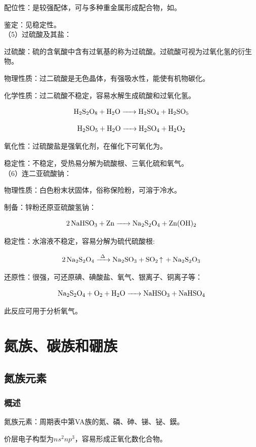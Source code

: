 \documentclass[a4paper,UTF8]{article}
\begin{document}
配位性：是较强配体，可与多种重金属形成配合物，如。

鉴定：见稳定性。\\

（5）过硫酸及其盐：

过硫酸：硫的含氧酸中含有过氧基的称为过硫酸。过硫酸可视为过氧化氢的衍生物。

物理性质：过二硫酸是无色晶体，有强吸水性，能使有机物碳化。

化学性质：过二硫酸不稳定，容易水解生成硫酸和过氧化氢。

$$ \ce{H2S2O8 + H2O -> H2SO4 + H2SO5} $$

$$ \ce{H2SO5 + H2O -> H2SO4 + H2O2} $$

氧化性：过硫酸盐是强氧化剂，在催化下可氧化为。

稳定性：不稳定，受热易分解为硫酸根、三氧化硫和氧气。\\

（6）连二亚硫酸钠：

物理性质：白色粉末状固体，俗称保险粉，可溶于冷水。

制备：锌粉还原亚硫酸氢钠：

$$ \ce{2NaHSO3 + Zn -> Na2S2O4 + Zn(OH)2} $$

稳定性：水溶液不稳定，容易分解为硫代硫酸根:

$$ \ce{2Na2S2O4 ->[\Delta] Na2SO3 + SO2 ^ + Na2S2O3} $$

还原性：很强，可还原碘、碘酸盐、氧气、银离子、铜离子等：

$$ \ce{Na2S2O4 + O2 + H2O -> NaHSO3 + NaHSO4} $$

此反应可用于分析氧气。

\section{氮族、碳族和硼族}

\subsection{氮族元素}

\subsubsection{概述}

氮族元素：周期表中第VA族的氮、磷、砷、锑、铋、鏌。

价层电子构型为$ns^2np^3$，容易形成正氧化数化合物。
\end{document}
